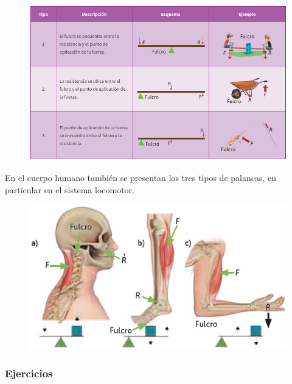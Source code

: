 \documentclass[11pt]{book}
\begin{document}
\begin{figure}[H]
    \centering
    \includegraphics[width=0.9\linewidth]{palanca_clase.jpg}
    \label{fig:palanca_clase}
\end{figure}

En el cuerpo humano también se presentan los tres tipos de palancas, en particular en el sistema locomotor.
\begin{figure}[H]
    \centering
    \includegraphics[width=0.6\linewidth]{palanca_body.jpg}
    \label{fig:palanca_body}
\end{figure}

\subsubsection{Ejercicios}
\end{document}

